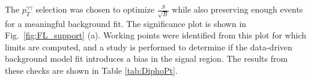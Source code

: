 


The $p_T^{\gamma\gamma}$ selection was chosen to optimize $\frac{S}{\sqrt{B}}$ while also preserving enough events for a meaningful background fit.
The signiﬁcance plot is shown in Fig.~\ref{fig:FL_support} (a).
Working points were identified from this plot for which limits are computed, and a study is performed to determine if the data-driven background model fit introduces a bias in the signal region.
The results from these checks are shown in Table \ref{tab:DiphoPt}.

